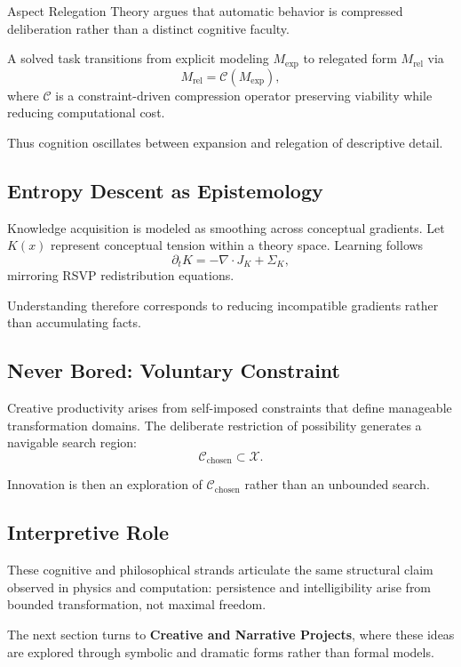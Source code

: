 \documentclass[12pt]{article}
\begin{document}
Aspect Relegation Theory argues that automatic behavior is compressed deliberation rather than a distinct cognitive faculty.

A solved task transitions from explicit modeling $M_{\text{exp}}$ to relegated form $M_{\text{rel}}$ via
\[
M_{\text{rel}} = \mathcal{C}(M_{\text{exp}}),
\]
where $\mathcal{C}$ is a constraint-driven compression operator preserving viability while reducing computational cost.

Thus cognition oscillates between expansion and relegation of descriptive detail.

\subsection{Entropy Descent as Epistemology}

Knowledge acquisition is modeled as smoothing across conceptual gradients. Let $K(x)$ represent conceptual tension within a theory space. Learning follows
\[
\partial_t K = -\nabla\cdot J_K + \Sigma_K,
\]
mirroring RSVP redistribution equations.

Understanding therefore corresponds to reducing incompatible gradients rather than accumulating facts.

\subsection{Never Bored: Voluntary Constraint}

Creative productivity arises from self-imposed constraints that define manageable transformation domains. The deliberate restriction of possibility generates a navigable search region:
\[
\mathcal{C}_{\text{chosen}}\subset\mathcal{X}.
\]

Innovation is then an exploration of $\mathcal{C}_{\text{chosen}}$ rather than an unbounded search.

\subsection{Interpretive Role}

These cognitive and philosophical strands articulate the same structural claim observed in physics and computation: persistence and intelligibility arise from bounded transformation, not maximal freedom.

\bigskip

The next section turns to \textbf{Creative and Narrative Projects}, where these ideas are explored through symbolic and dramatic forms rather than formal models.
\end{document}

